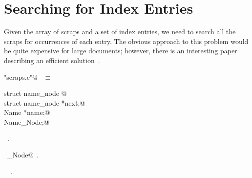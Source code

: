 \documentclass{report}
\begin{document}
\section{Searching for Index Entries} \label{search}

Given the array of scraps and a set of index entries, we need to
search all the scraps for occurrences of each entry. The obvious
approach to this problem would be quite expensive for large documents;
however, there is an interesting  paper describing an efficient
solution~\cite{aho:75}.


\begin{flushleft} \small
\begin{minipage}{\linewidth} \label{scrap213}
\verb@"scraps.c"@\nobreak\ {\footnotesize {} }$\equiv$
\vspace{-1ex}
\begin{list}{}{} \item
\mbox{}\verb@typedef struct name_node {@\\
\mbox{}\verb@  struct name_node *next;@\\
\mbox{}\verb@  Name *name;@\\
\mbox{}\verb@} Name_Node;@\\
\mbox{}\verb@@{\NWsep}
\end{list}
\vspace{-1ex}
\footnotesize\addtolength{\baselineskip}{-1ex}
\begin{list}{}{\setlength{\itemsep}{-\parsep}\setlength{\itemindent}{-\leftmargin}}
\item \NWtxtFileDefBy\ .
\end{list}
\vspace{-2ex}
\footnotesize\addtolength{\baselineskip}{-1ex}
\begin{list}{}{\setlength{\itemsep}{-\parsep}\setlength{\itemindent}{-\leftmargin}}
\item \NWtxtIdentsDefed\nobreak\  \verb@Name_Node@\nobreak\ .\end{list}
\vspace{-2ex}
\footnotesize\addtolength{\baselineskip}{-1ex}
\begin{list}{}{\setlength{\itemsep}{-\parsep}\setlength{\itemindent}{-\leftmargin}}
\item \NWtxtIdentsUsed\nobreak\  \verb@Name@\nobreak\ .\end{list}
\end{minipage}\\[4ex]
\end{flushleft}
\end{document}
